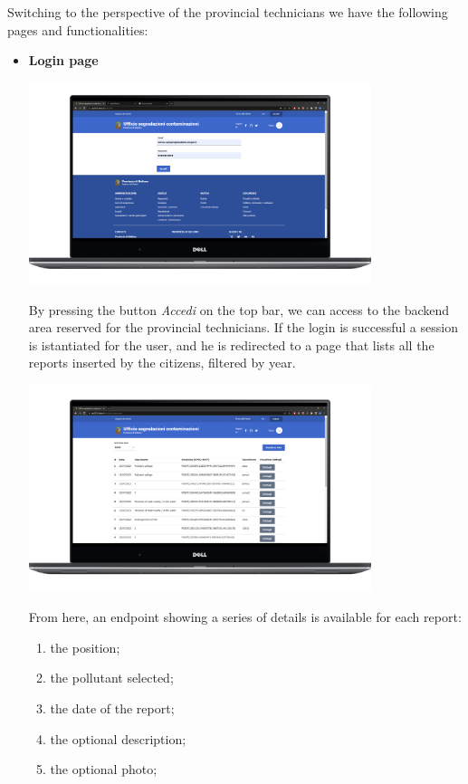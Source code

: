 Switching to the perspective of the provincial technicians we have the following pages and functionalities:
\begin{itemize}
    \item \textbf{Login page} \\
    \begin{center} \includegraphics[width=27em]{img/login.png} \end{center}
    By pressing the button \textit{Accedi} on the top bar, we can access to the backend area reserved for the provincial technicians.
    If the login is successful a session is istantiated for the user, and he is redirected to a page that lists all the reports inserted by the citizens, filtered by year.
    \begin{center} \includegraphics[width=27em]{img/home_back.png} \end{center}
    From here, an endpoint showing a series of details is available for each report:
    \begin{enumerate}
        \item the position;
        \item the pollutant selected;
        \item the date of the report;
        \item the optional description;
        \item the optional photo;

\end{enumerate}
\end{itemize}
